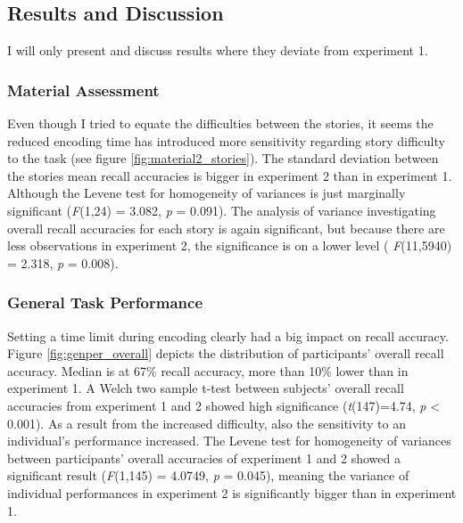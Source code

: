 \documentclass[a4paper,man,natbib,floatsintext,import]{apa6}
\begin{document}
\subsection{Results and Discussion}
I will only present and discuss results where they deviate from experiment 1.

\subsubsection{Material Assessment}
Even though I tried to equate the difficulties between the stories, it seems the reduced encoding time has introduced more sensitivity regarding story difficulty to the task (see figure \ref{fig:material2_stories}). The standard deviation between the stories mean recall accuracies is bigger in experiment 2 than in experiment 1. Although the Levene test for homogeneity of variances is just marginally significant (\textit{F}(1,24) = 3.082, \textit{p} = 0.091). The analysis of variance investigating overall recall accuracies for each story is again significant, but because there are less observations in experiment 2, the significance is on a lower level ( \textit{F}(11,5940) = 2.318, \textit{p} = 0.008).

\subsubsection{General Task Performance}
Setting a time limit during encoding clearly had a big impact on recall accuracy. Figure \ref{fig:genper_overall} depicts the distribution of participants' overall recall accuracy. Median is at 67\% recall accuracy, more than 10\% lower than in experiment 1. A Welch two sample t-test between subjects' overall recall accuracies from experiment 1 and 2 showed high significance (\textit{t}(147)=4.74, \textit{p} < 0.001). As a result from the increased difficulty, also the sensitivity to an individual's performance increased. The Levene test for homogeneity of variances between participants' overall accuracies of experiment 1 and 2 showed a significant result (\textit{F}(1,145) = 4.0749, \textit{p} = 0.045), meaning the variance of individual performances in experiment 2 is significantly bigger than in experiment 1.
\end{document}
